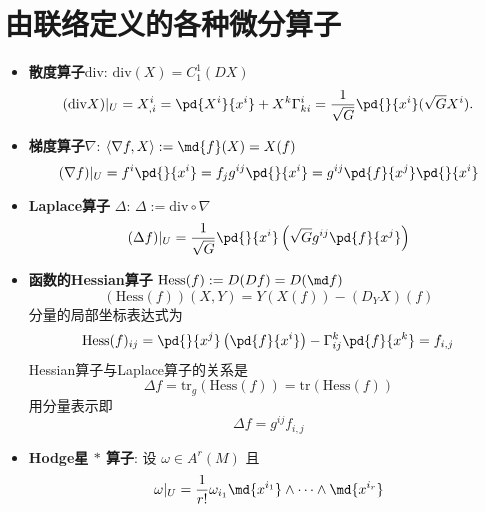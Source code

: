 \section{由联络定义的各种微分算子}
    \begin{itemize}
        \item \textbf{散度算子}div: $\mathrm{div}(X)=C_1^1(DX)$
        \begin{equation*}
            (\mathrm{div}X)|_U=X^i_{,i}=\pd{X^i}{x^i}+X^k\Gamma^i_{ki}=\frac{1}{\sqrt{G}}\pd{}{x^i}(\sqrt{G}X^i).
        \end{equation*}
        \item \textbf{梯度算子}$\nabla$: $\left\langle \nabla f,X\right\rangle:=\md{f}(X)=X(f)$ 
        \begin{equation*}
            (\nabla f)|_U = f^i\pd{}{x^i}=f_jg^{ij}\pd{}{x^i}=g^{ij}\pd{f}{x^j}\pd{}{x^i}
        \end{equation*}
        \item \textbf{Laplace算子} $\Delta$: $\Delta:=\mathrm{div}\circ\nabla$
        \begin{equation*}
            (\Delta f)|_U = \frac{1}{\sqrt{G}}\pd{}{x^i}\left(\sqrt{G}g^{ij}\pd{f}{x^j}\right)
        \end{equation*}
        \item \textbf{函数的Hessian算子} $\mathrm{Hess}(f):=D(Df)=D(\md f)$
        \begin{equation*}
            (\mathrm{Hess}(f))(X,Y)=Y(X(f))-(D_YX)(f)
        \end{equation*}
        分量的局部坐标表达式为
        \begin{equation*}
            \mathrm{Hess}(f)_{ij}=\pd{}{x^j}\left(\pd{f}{x^i}\right)-\Gamma^{k}_{ij}\pd{f}{x^k}=f_{i,j}
        \end{equation*}
        Hessian算子与Laplace算子的关系是
        \begin{equation*}
            \Delta f=\mathrm{tr}_g(\mathrm{Hess}(f))=\mathrm{tr}(\mathrm{Hess}(f))
        \end{equation*}
        用分量表示即
        \begin{equation*}
            \Delta f = g^{ij}f_{i,j}
        \end{equation*}
        \item \textbf{Hodge星 $*$ 算子}: 设 $\omega\in A^r(M)$ 且
        \begin{equation*}
            \omega|_U=\frac{1}{r!}\omega_{i_1}\md{x^{i_1}}\wedge\cdots\wedge\md{x^{i_r}}
        \end{equation*}

\end{itemize}

